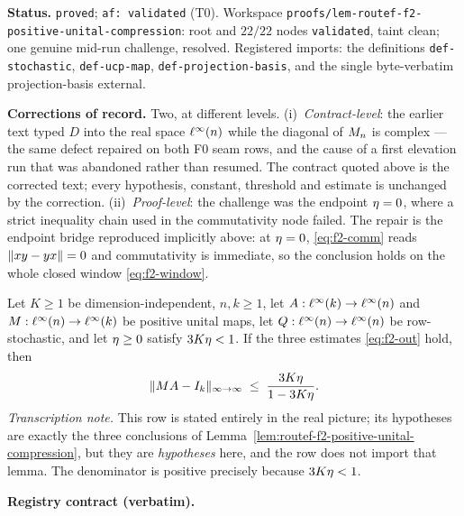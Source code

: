 \medskip
\noindent\textbf{Status.} \texttt{proved}; \texttt{af: validated} (T0). Workspace
\texttt{proofs/lem-routef-f2-positive-unital-compression}: root and $22/22$ nodes
\texttt{validated}, taint clean; one genuine mid-run challenge, resolved. Registered
imports: the definitions \texttt{def-stochastic}, \texttt{def-ucp-map},
\texttt{def-projection-basis}, and the single byte-verbatim projection-basis external.

\noindent\textbf{Corrections of record.} Two, at different levels. (i)~\emph{Contract-level}:
the earlier text typed $D$ into the real space $\ell^{\infty}(n)$ while the diagonal of $M_{n}$ is
complex --- the same defect repaired on both F0 seam rows, and the cause of a first
elevation run that was abandoned rather than resumed. The contract quoted above is the
corrected text; every hypothesis, constant, threshold and estimate is unchanged by the
correction. (ii)~\emph{Proof-level}: the challenge was the endpoint $\eta=0$, where a
strict inequality chain used in the commutativity node failed. The repair is the endpoint
bridge reproduced implicitly above: at $\eta=0$, \eqref{eq:f2-comm} reads
$\lVert xy-yx\rVert=0$ and commutativity is immediate, so the conclusion holds on the whole closed
window \eqref{eq:f2-window}.

\begin{lemma}\label{lem:routef-f3-retract-defect}
Let $K\ge1$ be dimension-independent, $n,k\ge1$, let $A:\ell^{\infty}(k)\to\ell^{\infty}(n)$ and
$M:\ell^{\infty}(n)\to\ell^{\infty}(k)$ be positive unital maps, let $Q:\ell^{\infty}(n)\to\ell^{\infty}(n)$ be
row-stochastic, and let $\eta\ge0$ satisfy $3K\eta<1$. If the three estimates
\eqref{eq:f2-out} hold, then
\begin{equation}\label{eq:f3-out}
  \lVert MA-I_{k} \rVert_{\infty\to\infty}\;\le\;\frac{3K\eta}{1-3K\eta}.
\end{equation}
\emph{Transcription note.} This row is stated entirely in the real picture; its hypotheses
are exactly the three conclusions of
Lemma~\ref{lem:routef-f2-positive-unital-compression}, but they are \emph{hypotheses} here,
and the row does not import that lemma. The denominator is positive precisely because
$3K\eta<1$.
\end{lemma}

\noindent\textbf{Registry contract (verbatim).}

